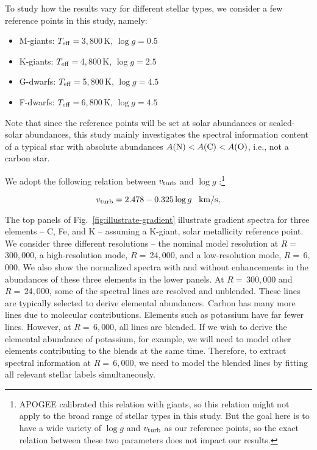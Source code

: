 \documentclass[iop]{emulateapj}
\begin{document}
\begin{CJK*}{UTF8}{gbsn}
To study how the results vary for different stellar types, we consider a few reference points in this study, namely:
\begin{itemize}
\item M-giants: $T_{\rm eff} = \,$3$,$800$\,$K, $\log g = 0.5$
\item K-giants: $T_{\rm eff} = \,$4$,$800$\,$K, $\log g = 2.5$
\item G-dwarfs: $T_{\rm eff} = \,$5$,$800$\,$K, $\log g = 4.5$
\item F-dwarfs: $T_{\rm eff} = \,$6$,$800$\,$K, $\log g = 4.5$
\end{itemize}
\noindent
Note that since the reference points will be set at solar abundances or scaled-solar abundances, this study mainly investigates the spectral information content of a typical star with absolute abundances $A({\rm N}) < A({\rm C}) < A({\rm O})$, i.e., not a carbon star.

We adopt the following relation between $v_{\rm turb}$ and $\log g$ \citep{hol15}:\footnote{APOGEE calibrated this relation with giants, so this relation might not apply to the broad range of stellar types in this study. But the goal here is to have a wide variety of $\log g$ and $v_{\rm turb}$ as our reference points, so the exact relation between these two parameters does not impact our results.}

\begin{equation}
v_{\rm turb} = 2.478 - 0.325 \log g \,\,\,\,\, {\rm km/s},
\end{equation}

\noindent
The top panels of Fig.~\ref{fig:illustrate-gradient} illustrate gradient spectra for three  elements -- C, Fe, and K -- assuming a K-giant, solar metallicity reference point. We consider three different resolutions -- the nominal model resolution at $R = \,$300$,$000, a high-resolution mode, $R = \,$24$,$000, and a low-resolution mode, $R = \,$6$,$000. We also show the normalized spectra with and without enhancements in the abundances of these three elements in the lower panels. At $R = \,$300$,$000 and $R = \,$24$,$000, some of the spectral lines are resolved and unblended. These lines are typically selected to derive elemental abundances. Carbon has many more lines due to molecular contributions. Elements such as potassium have far fewer lines. However, at $R = \,$6$,$000, all lines are blended. If we wish to derive the elemental abundance of potassium, for example, we will need to model other elements contributing to the blends at the same time. Therefore, to extract spectral information at $R = \,$6$,$000, we need to model the blended lines by fitting all relevant stellar labels simultaneously. 


\end{CJK*}
\end{document}
